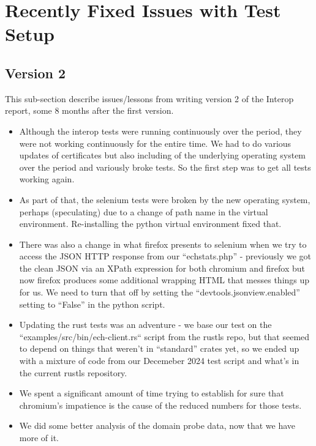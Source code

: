 \section{Recently Fixed Issues with Test Setup}
\label{app:alongtheway}

\subsection{Version 2}

This sub-section describe issues/lessons from writing version 2 of
the Interop report, some 8 months after the first version.

\begin{itemize}

\item Although the interop tests were running continuously over the period,
    they were not working continuously for the entire time. We had to do
        various updates of certificates but also including of the underlying
        operating system over the period and variously broke tests. So the
        first step was to get all tests working again.

\item As part of that, the selenium tests were broken by the new operating
    system, perhaps (speculating) due to a change of path name in the virtual
        environment. Re-installing the python virtual environment fixed that.

\item There was also a change in what firefox presents to selenium when we
    try to access the JSON HTTP response from our ``echstats.php'' -
        previously we got the clean JSON via an XPath
        expression for both chromium and firefox but now firefox produces
        some additional wrapping HTML that messes things up for us. We need
        to turn that off by setting the ``devtools.jsonview.enabled'' setting
        to ``False'' in the python script.

\item Updating the rust tests was an adventure - we base our test on the
    ``examples/src/bin/ech-client.rs`` script from the rustls repo, but 
        that seemed to depend on things that weren't in ``standard'' crates
        yet, so we ended up with a mixture of code from our Decemeber 2024
        test script and what's in the current rustls repository.

\item We spent a significant amount of time trying to establish for
    sure that chromium's impatience is the cause of the reduced numbers
    for those tests.

\item We did some better analysis of the domain probe data, now that we
    have more of it.

\end{itemize}

